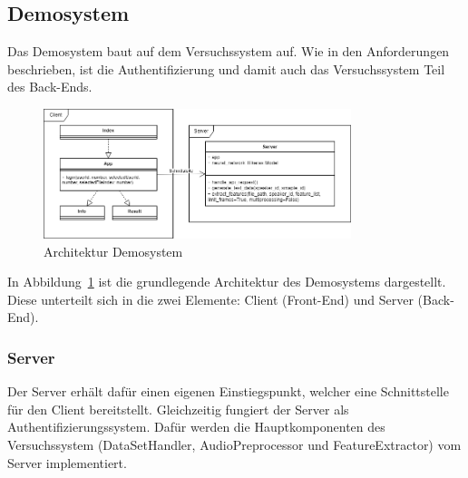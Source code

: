 \subsection{Demosystem}
Das Demosystem baut auf dem Versuchssystem auf.
Wie in den Anforderungen beschrieben, ist die Authentifizierung und damit auch das Versuchssystem Teil des Back-Ends.
\begin{figure}
    \centering
    \includegraphics[width=0.8\textwidth, keepaspectratio]{images/Architektur-Demosystem.png}
    \caption{Architektur Demosystem}
    \label{fig:ArchitectureDemoSystem}
\end{figure}
In Abbildung~\ref{fig:ArchitectureDemoSystem} ist die grundlegende Architektur des Demosystems dargestellt.
Diese unterteilt sich in die zwei Elemente: Client (Front-End) und Server (Back-End).

\subsubsection{Server}
Der Server erhält dafür einen eigenen Einstiegspunkt, welcher eine Schnittstelle für den Client bereitstellt.
Gleichzeitig fungiert der Server als Authentifizierungssystem.
Dafür werden die Hauptkomponenten des Versuchssystem (DataSetHandler, AudioPreprocessor und FeatureExtractor) vom Server implementiert.

